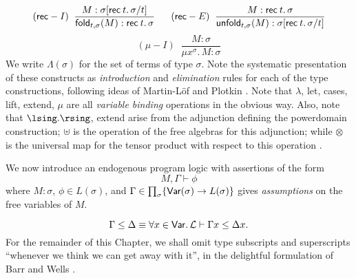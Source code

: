 \[ ({\sf rec}-I) \;\; \frac{M : \sigma [ {\sf rec} \: t. \, \sigma / t]}{{\sf fold}_{t, \sigma}(M) : {\sf rec} \: t . \, \sigma}
\;\;\;\;\;\;
   ({\sf rec}-E) \;\; \frac{M : {\sf rec} \: t . \, \sigma}{{\sf unfold}_{t, \sigma}(M) : \sigma [{\sf rec} \: t . \, \sigma / t]} \]
\[ ({\mu}-I) \;\; \frac{M : \sigma}{\mu x^{\sigma} . \, M : \sigma} \]
We write $\Lambda (\sigma )$ for the set of terms of type $\sigma$. 
Note the systematic presentation of these constructs as {\em introduction}
and {\em elimination} rules for each of the type constructions,
following ideas of Martin-L\"{o}f \cite{M-L83} and Plotkin \cite{Plo85}.
Note
that $\lambda$, {\sf let}, {\sf cases}, {\sf lift}, {\sf extend}, $\mu$  are
all {\em variable binding} operations in the obvious way.
Also, note
that $\lsing . \rsing$, {\sf extend} arise from the adjunction defining the
powerdomain construction; $\uplus$ is the operation of the free algebras
for this adjunction; while $\otimes$ is the universal map for the tensor
product with respect to this operation   \cite{HP79}.

We now introduce an endogenous program logic with assertions of the form
\[M,\Gamma \vdash \phi \] where $M:\sigma$, $\phi \in L(\sigma )$, and
$\Gamma \in \prod_{\sigma} \{{\sf Var}(\sigma ) \rightarrow L(\sigma )\}$
gives {\em assumptions} on the free variables of $M$.

\[ \Gamma \leq \Delta \equiv \forall x \in {\sf Var}. \, {\cal L} \vdash \Gamma
x \leq \Delta x . \]
For the remainder of this Chapter, we shall omit type subscripts and 
superscripts ``whenever we think we can get away with it'',
in the delightful formulation of Barr and Wells \cite[p.\ 1]{BW84}.
